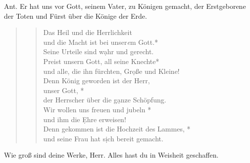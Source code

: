 \vspace{1cm}
\medskip

\def\greinitialformat#1{{\fontsize{40}{40}\selectfont #1}}
\gresetfirstlineaboveinitial{\small \textcolor{red}{Apoc 19}}{}
\setaboveinitialseparation{0.72mm}


\medskip

\begin{sloppypar}
{\noindent\rm{Ant. Er hat uns vor Gott, seinem Vater, zu Königen gemacht, 
der Erstgeborene der Toten und Fürst über die Könige der Erde.}}
\end{sloppypar}

\bigskip


\begin{quote}
\begin{verse}


Das Heil und die Herrlichkeit\\
und die Macht ist bei unser\textit{e}m Gott.*\\
Seine Urteile sind w\d ahr und gerecht.\\
\vin Preist unsern Gott, all seine Knechte*\\
\vin und alle, die ihn fürchten, Gr\d oße und Kleine!\\
Denn König geworden ist der Herr,\\
unser Gott, *\\
der Herrscher über die g\d anze Schöpfung.\\
\vin Wir wollen uns freuen und jubeln *\\
\vin und ihm die \d Ehre erweisen!\\
Denn gekommen ist die Hochzeit des Lammes, *\\
und seine Frau hat s\d ich bereit gemacht.

\end{verse}
\end{quote}

\medskip

\resp


\medskip

\begin{sloppypar}
{\noindent\rm{ Wie groß sind deine Werke, Herr. Alles hast du in Weisheit geschaffen.}}
\end{sloppypar}

